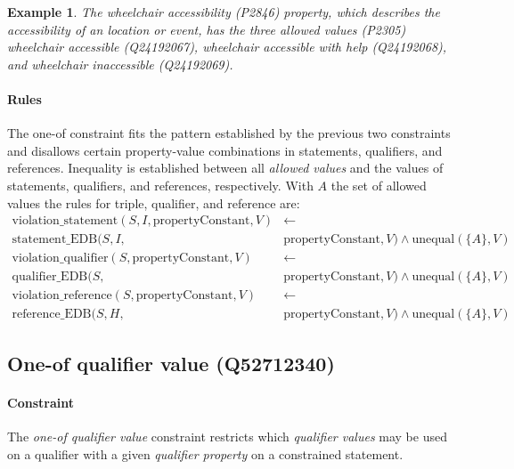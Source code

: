 \documentclass[hyperref,bachelorofscience,fleqn]{cgvpub}
\newtheorem{example}{Example}
\begin{document}
\begin{example}
The \emph{wheelchair accessibility} (P2846) property, which describes the accessibility of an location or event, has the three \emph{allowed values} (P2305) \emph{wheelchair accessible} (Q24192067), \emph{wheelchair accessible with help} (Q24192068), and \emph{wheelchair inaccessible} (Q24192069).
\end{example}

\paragraph{Rules}
The one-of constraint fits the pattern established by the previous two constraints and disallows certain property-value combinations in statements, qualifiers, and references. Inequality is established between all \emph{allowed values} and the values of statements, qualifiers, and references, respectively. With \(A\) the set of allowed values the rules for triple, qualifier, and reference are:
\begin{align*}
\text{violation\_statement}(S, I, \text{propertyConstant}, V) &\leftarrow \\
\text{statement\_EDB}(S, I, &\text{propertyConstant}, V) \wedge \text{unequal}(\{A\}, V) \\
\text{violation\_qualifier}(S, \text{propertyConstant}, V) &\leftarrow \\
\text{qualifier\_EDB}(S, &\text{propertyConstant}, V) \wedge \text{unequal}(\{A\}, V) \\
\text{violation\_reference}(S, \text{propertyConstant}, V) &\leftarrow \\
\text{reference\_EDB}(S, H, &\text{propertyConstant}, V) \wedge \text{unequal}(\{A\}, V)
\end{align*}

\subsection{One-of qualifier value (Q52712340)}
\paragraph{Constraint}
The \emph{one-of qualifier value} constraint restricts which \emph{qualifier values} may be used on a qualifier with a given \emph{qualifier property} on a constrained statement.
\end{document}
